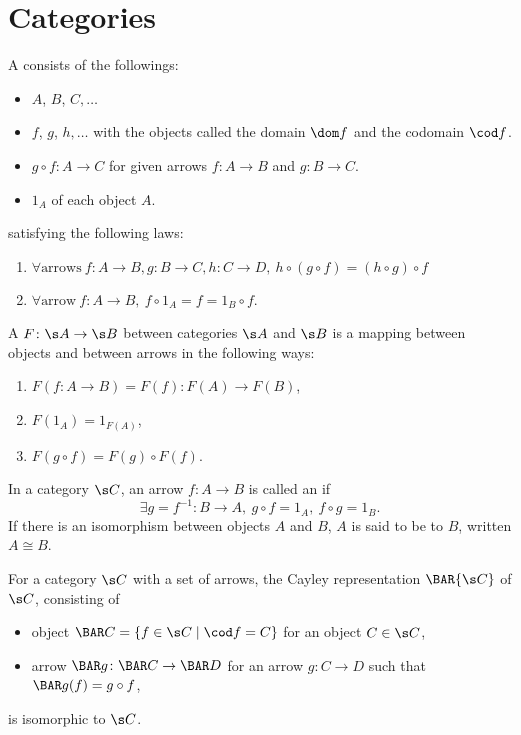 \newcommand{\sets}{\mathbf{Sets}}
\newcommand{\op}[1]{{#1}^{\mathrm{op}}}
\newcommand{\arr}[1]{{#1}^{\rightarrow}}
\section{Categories\cite{awodey}}
A  consists of the followings:
\begin{itemize}
\item {} $A$, $B$, $C, \dotsc$
\item {} $f$, $g$, $h, \dotsc$ with the objects called the domain $\dom f$ and the codomain $\cod f$.
\item {} $g \circ f \colon A \to C$ for given arrows $f \colon A \to B$ and $g \colon B \to C$.
\item {} $1_A$ of each object $A$.
\end{itemize}
satisfying the following laws:
\begin{enumerate}
\item $\forall \text{arrows}\ f \colon A \to B, g \colon B \to C, h \colon C \to D,\ h \circ (g \circ f) = (h \circ g) \circ f$
\item $\forall \text{arrow}\ f \colon A \to B,\ f \circ 1_A = f = 1_B \circ f$.
\end{enumerate}

A  $F\colon \s A \to \s B$ between categories $\s A$ and $\s B$ is a mapping between objects and between arrows in the following ways:
\begin{enumerate}
\item $F(f\colon A \to B) = F(f) \colon F(A) \to F(B)$,
\item $F(1_A) = 1_{F(A)}$,
\item $F(g \circ f) = F(g) \circ F(f)$.
\end{enumerate}

In a category $\s C$, an arrow $f \colon A \to B$ is called an  if
\[
\exists g = f^{-1} \colon B \to A,\ g \circ f = 1_A,\ f \circ g = 1_B.
\]
If there is an isomorphism between objects $A$ and $B$, $A$ is said to be  to $B$, written $A \cong B$.

For a category $\s C$ with a set of arrows, the Cayley representation $\BAR{\s C}$ of $\s C$, consisting of
\begin{itemize}
  \item object $\BAR C = \{ f \in \s C \mid \cod f = C \}$ for an object $C \in \s C$,
  \item arrow $\BAR g \colon \BAR C \to \BAR D$ for an arrow $g \colon C \to D$ such that $\BAR g (f) = g \circ f$,
\end{itemize}
is isomorphic to $\s C$.

